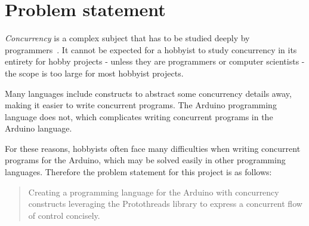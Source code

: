 \section{Problem statement}\label{sec:problemstatement}
\textit{Concurrency} is a complex subject that has to be studied deeply by programmers~\cite{Sebesta2016}. It cannot be expected for a hobbyist to study concurrency in its entirety for hobby projects - unless they are programmers or computer scientists - the scope is too large for most hobbyist projects.

Many languages include constructs to abstract some concurrency details away, making it easier to write concurrent programs. The Arduino programming language does not, which complicates writing concurrent programs in the Arduino language.

For these reasons, hobbyists often face many difficulties when writing concurrent programs for the Arduino, which may be solved easily in other programming languages. Therefore the problem statement for this project is as follows:

\blockquote{Creating a programming language for the Arduino with concurrency constructs leveraging the Protothreads library to express a concurrent flow of control concisely.}








